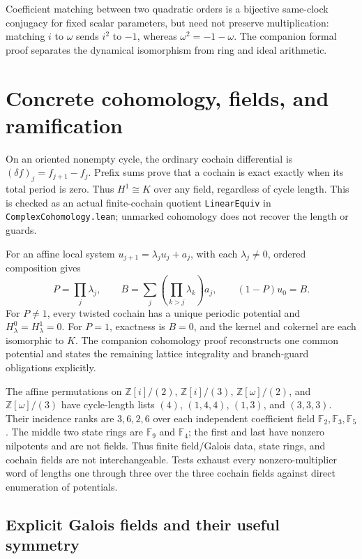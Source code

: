 \documentclass[11pt,letterpaper]{article}
\newcommand{\Z}{\mathbb{Z}}
\begin{document}
Coefficient matching between two quadratic orders is a bijective
same-clock conjugacy for fixed scalar parameters, but need not preserve
multiplication: matching \(i\) to \(\omega\) sends \(i^2\) to \(-1\),
whereas \(\omega^2=-1-\omega\). The companion formal proof separates
the dynamical isomorphism from ring and ideal arithmetic.

\section{Concrete cohomology, fields, and ramification}

On an oriented nonempty cycle, the ordinary cochain differential is \((\delta f)_j=f_{j+1}-f_j\). Prefix sums prove that a cochain is exact exactly when its total period is zero. Thus \(H^1\cong K\) over any field, regardless of cycle length. This is checked as an actual finite-cochain quotient \texttt{LinearEquiv} in \texttt{ComplexCohomology.lean}; unmarked cohomology does not recover the length or guards.

For an affine local system \(u_{j+1}=\lambda_j u_j+a_j\), with each \(\lambda_j\ne0\), ordered composition gives
\[
P=\prod_j\lambda_j,
\qquad B=\sum_j\left(\prod_{k>j}\lambda_k\right)a_j,
\qquad (1-P)u_0=B.
\]
For \(P\ne1\), every twisted cochain has a unique periodic potential and \(H^0_\lambda=H^1_\lambda=0\). For \(P=1\), exactness is \(B=0\), and the kernel and cokernel are each isomorphic to \(K\). The companion cohomology proof reconstructs one common potential and states the remaining lattice integrality and branch-guard obligations explicitly.

The affine permutations on \(\Z[i]/(2)\), \(\Z[i]/(3)\), \(\Z[\omega]/(2)\), and \(\Z[\omega]/(3)\) have cycle-length lists \((4)\), \((1,4,4)\), \((1,3)\), and \((3,3,3)\). Their incidence ranks are \(3,6,2,6\) over each independent coefficient field \(\mathbb F_2,\mathbb F_3,\mathbb F_5\). The middle two state rings are \(\mathbb F_9\) and \(\mathbb F_4\); the first and last have nonzero nilpotents and are not fields. Thus finite field/Galois data, state rings, and cochain fields are not interchangeable. Tests exhaust every nonzero-multiplier word of lengths one through three over the three cochain fields against direct enumeration of potentials.

\subsection{Explicit Galois fields and their useful symmetry}
\end{document}
